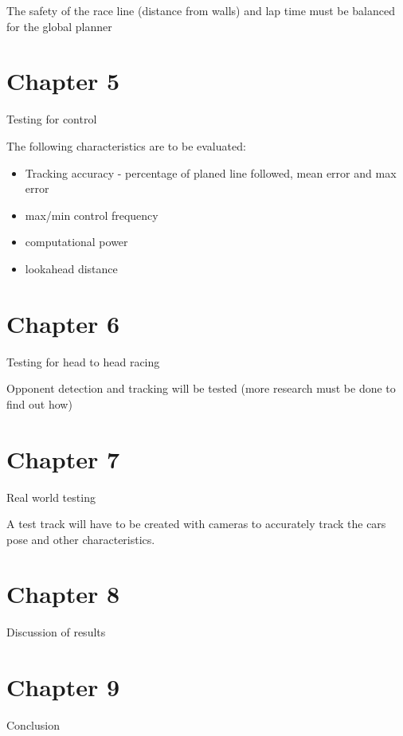 The safety of the race line (distance from walls) and lap time must be balanced for the global planner

\section{Chapter 5}
Testing for control

The following characteristics are to be evaluated:
\begin{itemize}
    \item Tracking accuracy - percentage of planed line followed, mean error and max error
    \item max/min control frequency
    \item computational power
    \item lookahead distance
\end{itemize}
\section{Chapter 6}
Testing for head to head racing

Opponent detection and tracking will be tested (more research must be done to find out how)

\section{Chapter 7}
Real world testing

A test track will have to be created with cameras to accurately track the cars pose and other characteristics.

\section{Chapter 8}
Discussion of results
\section{Chapter 9}
Conclusion


